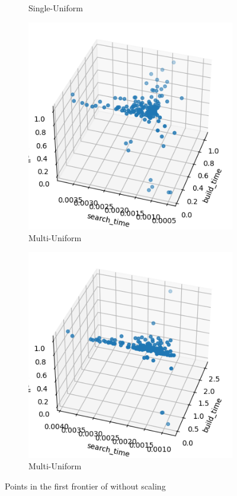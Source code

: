 \begin{figure}[ht]
\begin{subfigure}{0.24\textwidth}
        \caption{Single-Uniform}
    \end{subfigure}
    \hfill
    \begin{subfigure}{0.24\textwidth}
        \includegraphics[width=\textwidth]{../images/report/non-scaling-frontier-multi-unif.png}
        \caption{Multi-Uniform}
    \end{subfigure}
    \hfill
    \begin{subfigure}{0.24\textwidth}
        \includegraphics[width=\textwidth]{../images/report/non-scaling-frontier-multi-tour.png}
        \caption{Multi-Uniform}
    \end{subfigure}
    \hfill
    \caption{Points in the first frontier of without scaling}
    \label{fig:non-scaling-frontiers}
\end{figure}


